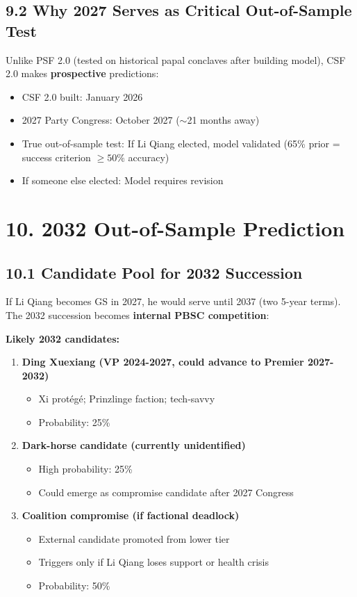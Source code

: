 \documentclass[11pt]{article}
\begin{document}
\subsection{9.2 Why 2027 Serves as Critical Out-of-Sample Test}

Unlike PSF 2.0 (tested on historical papal conclaves after building model), CSF 2.0 makes \textbf{prospective} predictions:

\begin{itemize}
\item CSF 2.0 built: January 2026
\item 2027 Party Congress: October 2027 ($\sim$21 months away)
\item True out-of-sample test: If Li Qiang elected, model validated (65\% prior = success criterion $\geq 50\%$ accuracy)
\item If someone else elected: Model requires revision
\end{itemize}

\section{10. 2032 Out-of-Sample Prediction}

\subsection{10.1 Candidate Pool for 2032 Succession}

If Li Qiang becomes GS in 2027, he would serve until 2037 (two 5-year terms). The 2032 succession becomes \textbf{internal PBSC competition}:

\textbf{Likely 2032 candidates:}
\begin{enumerate}
\item \textbf{Ding Xuexiang (VP 2024-2027, could advance to Premier 2027-2032)}
   \begin{itemize}
   \item Xi protégé; Prinzlinge faction; tech-savvy
   \item Probability: 25\%
   \end{itemize}

\item \textbf{Dark-horse candidate (currently unidentified)}
   \begin{itemize}
   \item High probability: 25\%
   \item Could emerge as compromise candidate after 2027 Congress
   \end{itemize}

\item \textbf{Coalition compromise (if factional deadlock)}
   \begin{itemize}
   \item External candidate promoted from lower tier
   \item Triggers only if Li Qiang loses support or health crisis
   \item Probability: 50\%
   \end{itemize}
\end{enumerate}
\end{document}
